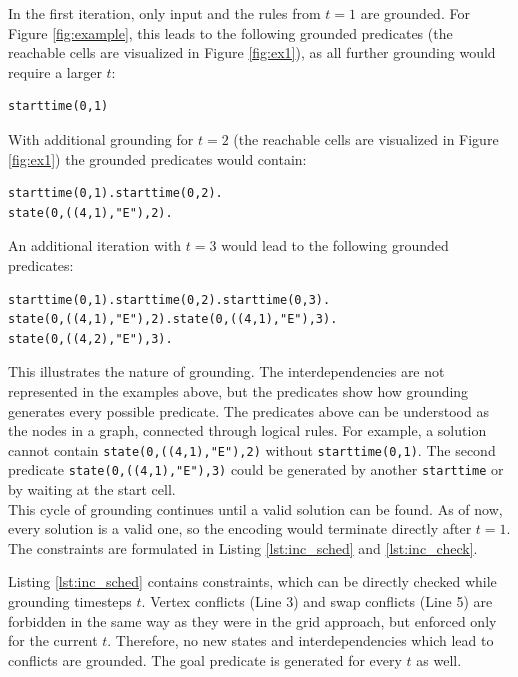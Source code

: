 \documentclass{llncs}
\begin{document}
\begin{multicols*}{2}
In the first iteration, only input and the rules from $t=1$ are grounded. For Figure \ref{fig:example}, this leads to the following grounded predicates (the reachable cells are visualized in Figure \ref{fig:ex1}), as all further grounding would require a larger $t$:

\begin{small}
\begin{verbatim}
starttime(0,1)
\end{verbatim}
\end{small}

With additional grounding for $t=2$ (the reachable cells are visualized in Figure \ref{fig:ex1}) the grounded predicates would contain:

\begin{small}
\begin{verbatim}
starttime(0,1).starttime(0,2).
state(0,((4,1),"E"),2).
\end{verbatim}
\end{small}

An additional iteration with $t=3$ would lead to the following grounded predicates:

\begin{small}
\begin{verbatim}
starttime(0,1).starttime(0,2).starttime(0,3).
state(0,((4,1),"E"),2).state(0,((4,1),"E"),3).
state(0,((4,2),"E"),3).
\end{verbatim}
\end{small}

This illustrates the nature of grounding. The interdependencies are not represented in the examples above, but the predicates show how grounding generates every possible predicate. The predicates above can be understood as the nodes in a graph, connected through logical rules. For example, a solution cannot contain \texttt{state(0,((4,1),"E"),2)} without \texttt{starttime(0,1)}. The second predicate \texttt{state(0,((4,1),"E"),3)} could be generated by another \texttt{starttime} or by waiting at the start cell.\\

This cycle of grounding continues until a valid solution can be found. As of now, every solution is a valid one, so the encoding would terminate directly after $t=1$. The constraints are formulated in Listing \ref{lst:inc_sched} and \ref{lst:inc_check}.

Listing \ref{lst:inc_sched} contains constraints, which can be directly checked while grounding timesteps $t$. Vertex conflicts (Line 3) and swap conflicts (Line 5) are forbidden in the same way as they were in the grid approach, but enforced only for the current $t$. Therefore, no new states and interdependencies which lead to conflicts are grounded. The goal predicate is generated for every $t$ as well.


\end{multicols*}
\end{document}
